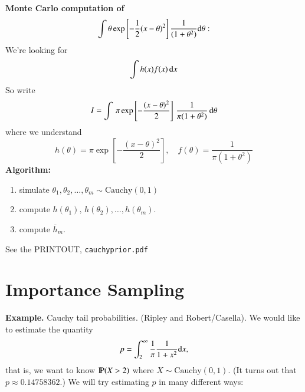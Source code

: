 \documentclass[captions=tableheading]{scrbook}
\begin{document}
\bigskip \noindent

\textbf{Monte Carlo computation of}
\[
\int \theta \exp \left[-\frac{1}{2}(x - \theta)^2  \right] \frac{1}{(1 + \theta^{2})} \diff \theta :
\]
We're looking for
\[
\int h(x)f(x)\,\diff x
\]
So write
\[
I = \int \,\pi \exp\left[-\frac{(x - \theta)^{2}}{2} \right]\,\frac{1}{\pi(1 + \theta^{2})}\, \diff \theta
\]
where we understand
\[
h(\theta) = \pi \exp\left[-\frac{(x - \theta)^{2}}{2} \right],\quad f(\theta) = \frac{1}{\pi(1 + \theta^{2})}
\]
\textbf{Algorithm:}

\begin{enumerate}
\item simulate \(\theta_{1},\theta_{2},\ldots,\theta_{m}\sim \mathrm{Cauchy}(0,1)\)
\item compute \(h(\theta_{1}),\,h(\theta_{2}),\ldots,h(\theta_{m})\).
\item compute \( \overline{h}_{m}\).
\end{enumerate}

See the PRINTOUT, \texttt{cauchyprior.pdf}
\section{Importance Sampling}
\label{sec-3_4}


\textbf{Example.} Cauchy tail probabilities. (Ripley and Robert/Casella). 
We would like to estimate the quantity 
\[
p=\int_{2}^{\infty}\frac{1}{\pi}\frac{1}{1+x^{2}}\diff x,
\]
that is, we want to know $\P(X > 2)$ where $X \sim \mathrm{Cauchy}(0,1)$. (It turns out that $p\approx 0.14758362$.) We will try estimating $p$ in many different ways:
\end{document}
